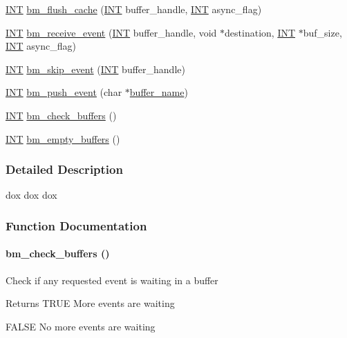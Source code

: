 \begin{DoxyCompactItemize}
\item 
\hyperlink{vppg_8h_a392e62da233ed3e2f7c3fd4f487a3896}{INT} \hyperlink{group__bmfunctionc_ga9b74b8aa633c942682e642acba93c51d}{bm\_\-flush\_\-cache} (\hyperlink{vppg_8h_a392e62da233ed3e2f7c3fd4f487a3896}{INT} buffer\_\-handle, \hyperlink{vppg_8h_a392e62da233ed3e2f7c3fd4f487a3896}{INT} async\_\-flag)
\item 
\hyperlink{vppg_8h_a392e62da233ed3e2f7c3fd4f487a3896}{INT} \hyperlink{group__bmfunctionc_ga2fd8bb52ad5282be3ce076e84bc007fa}{bm\_\-receive\_\-event} (\hyperlink{vppg_8h_a392e62da233ed3e2f7c3fd4f487a3896}{INT} buffer\_\-handle, void $\ast$destination, \hyperlink{vppg_8h_a392e62da233ed3e2f7c3fd4f487a3896}{INT} $\ast$buf\_\-size, \hyperlink{vppg_8h_a392e62da233ed3e2f7c3fd4f487a3896}{INT} async\_\-flag)
\item 
\hyperlink{vppg_8h_a392e62da233ed3e2f7c3fd4f487a3896}{INT} \hyperlink{group__bmfunctionc_ga4a12567d843b2e1d20da58d8abfabb04}{bm\_\-skip\_\-event} (\hyperlink{vppg_8h_a392e62da233ed3e2f7c3fd4f487a3896}{INT} buffer\_\-handle)
\item 
\hyperlink{vppg_8h_a392e62da233ed3e2f7c3fd4f487a3896}{INT} \hyperlink{group__bmfunctionc_gabcc6bb732b720fcc3ffe859f732a07e0}{bm\_\-push\_\-event} (char $\ast$\hyperlink{mevb_8c_a93bc09c1f5f9f26a081d11962971f301}{buffer\_\-name})
\item 
\hyperlink{vppg_8h_a392e62da233ed3e2f7c3fd4f487a3896}{INT} \hyperlink{group__bmfunctionc_ga6f72d4840fd9ca14a9864252fe5d8b3a}{bm\_\-check\_\-buffers} ()
\item 
\hyperlink{vppg_8h_a392e62da233ed3e2f7c3fd4f487a3896}{INT} \hyperlink{group__bmfunctionc_ga516c50d818df89f466ac1fc135120fa6}{bm\_\-empty\_\-buffers} ()
\end{DoxyCompactItemize}


\subsubsection{Detailed Description}
dox dox dox 

\subsubsection{Function Documentation}
\paragraph[{bm\_\-check\_\-buffers}]{ bm\_\-check\_\-buffers ()}\hfill\label{group__bmfunctionc_ga6f72d4840fd9ca14a9864252fe5d8b3a}
Check if any requested event is waiting in a buffer \begin{DoxyReturn}{Returns}
TRUE More events are waiting\par
 FALSE No more events are waiting 
\end{DoxyReturn}


